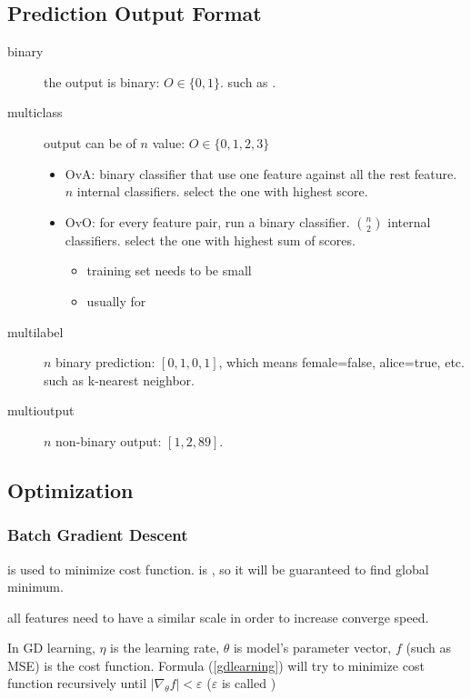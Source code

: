 \subsection{Prediction Output Format}

\begin{description}
	\item [binary] the output is binary: $O \in \{ 0, 1\}$. such as . 
	\item [multiclass] output can be of $n$ value: $O \in \{ 0,1,2,3\}$
		\begin{itemize}
			\item OvA: binary classifier that use one feature against all the rest feature. $n$ internal classifiers. select the one with highest score.
			\item OvO: for every feature pair, run a binary classifier. $\binom{n}{2}$ internal classifiers. select the one with highest sum of scores.
			\begin{itemize}
				\item training set needs to be small
				\item usually for 
			\end{itemize}
		\end{itemize}
	\item [multilabel] $n$ binary prediction: $[0,1,0,1]$, which means female=false, alice=true, etc. such as k-nearest neighbor. 
	\item [multioutput] $n$ non-binary output: $[1,2,89]$.
\end{description}


\subsection{Optimization}

\subsubsection{Batch Gradient Descent}

 is used to minimize cost function.  is , so it will be guaranteed to find global minimum.

all features need to have a similar scale in order to increase converge speed.

In GD learning, $\eta$ is the learning rate, $\theta$ is model's parameter vector, $f$ (such as MSE) is the cost function. Formula (\ref{gdlearning}) will try to minimize cost function recursively until $|\nabla_\theta f| < \varepsilon$ ($\varepsilon$ is called )


